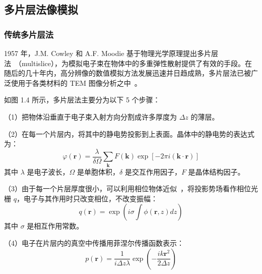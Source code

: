 \subsection{多片层法像模拟}
\subsubsection{传统多片层法}
1957 年，J.M. Cowley 和 A.F. Moodie 基于物理光学原理提出多片层法~\cite{Cowley1957}（multislice），为模拟电子束在物体中的多重弹性散射提供了有效的手段。在随后的几十年内，高分辨像的数值模拟方法发展迅速并日趋成熟，多片层法已被广泛使用于各类材料的 TEM 图像分析之中~\cite{Cai2009,Cai2012,Chen1997,Ming2013,Chen1996}。

如图 1.4 所示，多片层法主要分为以下 5 个步骤：

（1）把物体沿垂直于电子束入射方向分割成许多厚度为 $\Delta z$ 的薄层。

（2）在每一个片层内，将其中的静电势投影到上表面。晶体中的静电势的表达式为：
\begin{equation}\varphi(\boldsymbol{r})=\frac{\lambda}{\delta \Omega} \sum_{\boldsymbol{k}} F(\boldsymbol{k}) \exp [-2 \pi i(\boldsymbol{k} \cdot \boldsymbol{r})]\end{equation}
其中 $\lambda$ 是电子波长，$\Omega$ 是单胞体积，$\delta$ 是交互作用因子，$F$ 是晶体结构因子。

（3）由于每一个片层厚度很小，可以利用相位物体近似~\cite{cai2004,Ming2017}，将投影势场看作相位光栅 $q$，电子与其作用时只改变相位，不改变振幅：
\begin{equation}
q(\boldsymbol{r})=\exp\left(i\sigma\int\phi(\boldsymbol{r},z)dz\right)
\end{equation}
其中 $\sigma$ 是相互作用常数。

（4）电子在片层内的真空中传播用菲涅尔传播函数表示：
\begin{equation}
p(\boldsymbol{r})=\frac{1}{i\Delta z \lambda}\exp\left(-\frac{ik\boldsymbol{r}^2}{2\Delta z}\right)
\end{equation}

